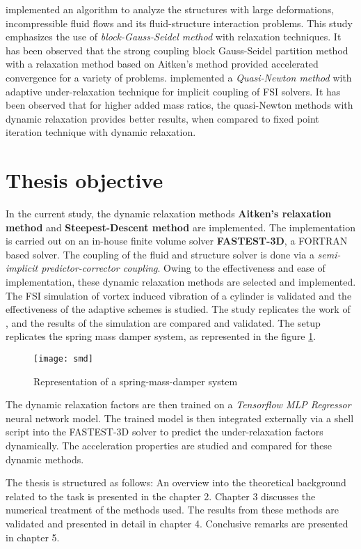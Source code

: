 \citet{valdes2016nonlinear} implemented an algorithm to analyze the structures with large deformations, incompressible fluid flows and its fluid-structure interaction problems. This study emphasizes the use of \textit{block-Gauss-Seidel method} with relaxation techniques.       It has been observed that the strong coupling block Gauss-Seidel partition method with a relaxation method based on Aitken's method provided accelerated convergence for a variety of problems. \citet{bogaers2014quasi} implemented a \textit{Quasi-Newton method} with adaptive under-relaxation technique for implicit coupling of FSI solvers. It has been observed that for higher added mass ratios, the quasi-Newton methods with dynamic relaxation provides better results, when compared to fixed point iteration technique with dynamic relaxation.    

\section{Thesis objective}
In the current study, the dynamic relaxation methods \textbf{Aitken's relaxation method} and \textbf{Steepest-Descent method} are implemented. The implementation is carried out on an in-house finite volume solver \textbf{FASTEST-3D}, a FORTRAN based solver. The coupling of the fluid and structure solver is done via a \textit{semi-implicit predictor-corrector coupling}. Owing to the effectiveness and ease of implementation, these dynamic relaxation methods are selected and implemented. The FSI simulation of vortex induced vibration of a cylinder is validated and the effectiveness of the adaptive schemes is studied. The study replicates the work of \citet{zhou1999vortex}, and the results of the simulation are compared and validated. The setup replicates the spring mass damper system, as represented in the figure \ref{fig:1.1}. 

\begin{figure}[h]
\centering
\texttt{[image: smd]}
\caption{Representation of a spring-mass-damper system}
\label{fig:1.1}
\end{figure} 

The dynamic relaxation factors are then trained on a \textit{Tensorflow MLP Regressor} neural network model. The trained model is then integrated externally via a shell script into the FASTEST-3D solver to predict the under-relaxation factors dynamically. The acceleration properties are studied and compared for these dynamic methods. 

The thesis is structured as follows: An overview into the theoretical background related to the task is presented in the chapter 2. Chapter 3 discusses the numerical treatment of the methods used. The results from these methods are validated and presented in detail in chapter 4. Conclusive remarks are presented in chapter 5.  
